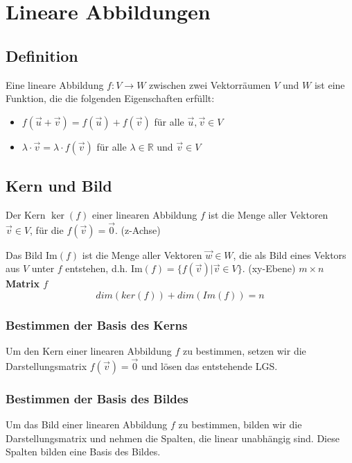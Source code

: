 \documentclass{article}
\begin{document}
\section*{Lineare Abbildungen}
\begin{minipage}[t]{0.45\textwidth}
    \subsection*{Definition}
    Eine lineare Abbildung \( f: V \to W \) zwischen zwei Vektorräumen \( V \) und \( W \) ist eine Funktion, die die folgenden Eigenschaften erfüllt:
    \begin{itemize}
        \item \( f(\vec{u} + \vec{v}) = f(\vec{u}) + f(\vec{v}) \) für alle \( \vec{u}, \vec{v} \in V \)
        \item $\lambda \cdot \vec{v} = \lambda \cdot f(\vec{v})$ für alle \( \lambda \in \mathbb{R} \) und \( \vec{v} \in V \)
    \end{itemize}

    \subsection*{Kern und Bild}
    Der Kern \( \ker(f) \) einer linearen Abbildung \( f \) ist die Menge aller Vektoren \( \vec{v} \in V \), für die \( f(\vec{v}) = \vec{0} \). (z-Achse)
    
    Das Bild \( \text{Im}(f) \) ist die Menge aller Vektoren \( \vec{w} \in W \), die als Bild eines Vektors aus \( V \) unter \( f \) entstehen, d.h. \( \text{Im}(f) = \{ f(\vec{v}) | \vec{v} \in V \} \). (xy-Ebene)
    \newline
    \newline
    \textbf{$m \times n$ Matrix $f$ }
    \begin{equation*}
        dim(ker(f)) + dim(Im(f)) = n
    \end{equation*}

    \subsubsection*{Bestimmen der Basis des Kerns}
    Um den Kern einer linearen Abbildung \( f \) zu bestimmen, setzen wir die Darstellungsmatrix \( f(\vec{v}) = \vec{0} \) und lösen das entstehende LGS.

    \subsubsection*{Bestimmen der Basis des Bildes}
    Um das Bild einer linearen Abbildung \( f \) zu bestimmen, bilden wir die Darstellungsmatrix und nehmen die Spalten, die linear unabhängig sind. Diese Spalten bilden eine Basis des Bildes.


\end{minipage}
\end{document}
